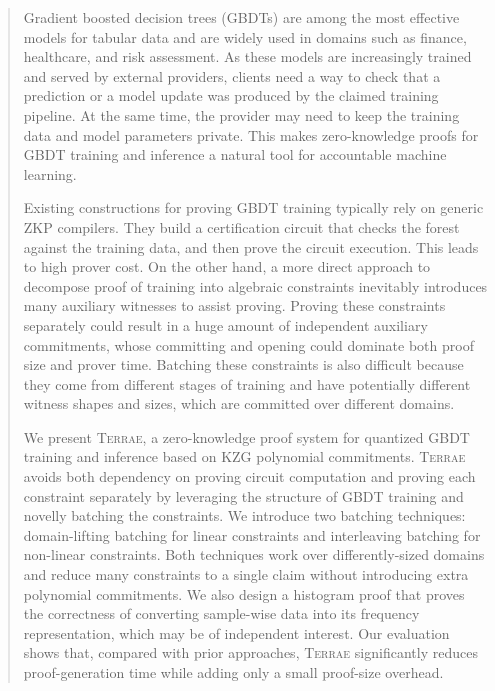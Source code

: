 \begin{abstract}
Gradient boosted decision trees (GBDTs) are among the most effective models for tabular data and are widely used in domains such as finance, healthcare, and risk assessment. As these models are increasingly trained and served by external providers, clients need a way to check that a prediction or a model update was produced by the claimed training pipeline. At the same time, the provider may need to keep the training data and model parameters private. This makes zero-knowledge proofs for GBDT training and inference a natural tool for accountable machine learning.

Existing constructions for proving GBDT training typically rely on generic ZKP compilers. They build a certification circuit that checks the forest against the training data, and then prove the circuit execution. This leads to high prover cost. On the other hand, a more direct approach to decompose proof of training into algebraic constraints inevitably introduces many auxiliary witnesses to assist proving. Proving these constraints separately could result in a huge amount of independent auxiliary commitments, whose committing and opening could dominate both proof size and prover time. Batching these constraints is also difficult because they come from different stages of training and have potentially different witness shapes and sizes, which are committed over different domains.

We present \textsc{Terrae}, a zero-knowledge proof system for quantized GBDT training and inference based on KZG polynomial commitments. \textsc{Terrae} avoids both dependency on proving circuit computation and proving each constraint separately by leveraging the structure of GBDT training and novelly batching the constraints. We introduce two batching techniques: domain-lifting batching for linear constraints and interleaving batching for non-linear constraints. Both techniques work over differently-sized domains and reduce many constraints to a single claim without introducing extra polynomial commitments. We also design a histogram proof that proves the correctness of converting sample-wise data into its frequency representation, which may be of independent interest. Our evaluation shows that, compared with prior approaches, \textsc{Terrae} significantly reduces proof-generation time while adding only a small proof-size overhead.
\end{abstract}
